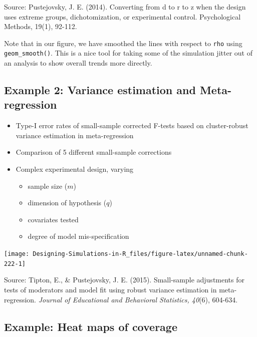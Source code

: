 \documentclass[
]{book}
\providecommand{\tightlist}{%
  \setlength{\itemsep}{0pt}\setlength{\parskip}{0pt}}
\begin{document}
Source: Pustejovsky, J. E. (2014). Converting from d to r to z when the design uses extreme groups, dichotomization, or experimental control. Psychological Methods, 19(1), 92-112.

Note that in our figure, we have smoothed the lines with respect to \texttt{rho} using \texttt{geom\_smooth()}.
This is a nice tool for taking some of the simulation jitter out of an analysis to show overall trends more directly.

\hypertarget{example-2-variance-estimation-and-meta-regression}{%
\subsection{Example 2: Variance estimation and Meta-regression}\label{example-2-variance-estimation-and-meta-regression}}

\begin{itemize}
\tightlist
\item
  Type-I error rates of small-sample corrected F-tests based on cluster-robust variance estimation in meta-regression
\item
  Comparison of 5 different small-sample corrections
\item
  Complex experimental design, varying

  \begin{itemize}
  \tightlist
  \item
    sample size (\(m\))
  \item
    dimension of hypothesis (\(q\))
  \item
    covariates tested
  \item
    degree of model mis-specification
  \end{itemize}
\end{itemize}

\begin{center}\texttt{[image: Designing-Simulations-in-R\_files/figure-latex/unnamed-chunk-222-1]} \end{center}

Source: Tipton, E., \& Pustejovsky, J. E. (2015). Small-sample adjustments for tests of moderators and model fit using robust variance estimation in meta-regression. \emph{Journal of Educational and Behavioral Statistics, 40}(6), 604-634.

\hypertarget{example-heat-maps-of-coverage}{%
\subsection{Example: Heat maps of coverage}\label{example-heat-maps-of-coverage}}
\end{document}
